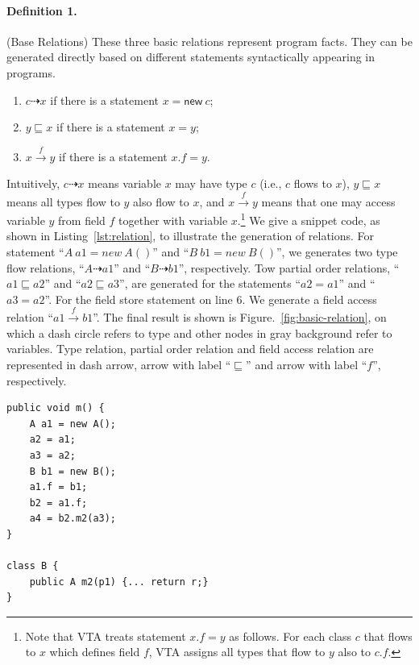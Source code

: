 \documentclass{fac}
\newcommand{\keyword}[1]{\mathsf{#1}}
\newcommand{\kwnew}[0]{\keyword{new}}
\newcommand{\less}{\sqsubseteq}
\newcommand{\tflow}{\dashrightarrow}
\newcommand{\hflow}{\longrightarrow}
\newcommand{\lhflow}[1]{\stackrel{#1}{\hflow}}
\begin{document}
\paragraph{Definition 1.}\label{def:base} (Base Relations)
These three basic relations represent program facts. They can be generated directly based on different statements syntactically appearing in programs.
\begin{enumerate}
  \item $c\tflow x$ if there is a statement $x = \kwnew\ c$;
  \item $y\less x$ if there is a statement $x = y $;
  \item $x\lhflow{f}y$ if there is a statement $x.f = y$.
\end{enumerate}
Intuitively, $c\tflow x$ means variable $x$ may have type $c$ (i.e., $c$ flows to $x$), $y\less x$ means all types flow to $y$ also flow to $x$, and $x\lhflow{f}y$ means that one may access variable $y$ from field $f$ together with variable $x$.\footnote{Note that VTA treats statement $x.f = y$ as follows. For each class $c$ that flows to $x$ which defines field $f$, VTA assigns all types that flow to $y$ also to $c.f$.}
We give a snippet code, as shown in Listing~\ref{lst:relation}, to illustrate the generation of relations. For statement ``$A\ a1=new \ A()$'' and ``$B\ b1=new\ B()$'', we generates two type flow relations, ``$A \tflow a1$'' and ``$B \tflow b1$'', respectively. Tow partial order relations, ``$a1 \less a2$'' and ``$a2 \less a3$'', are generated for the statements ``$a2=a1$'' and ``$a3=a2$''. For the field store statement on line 6. We generate a field access relation ``$a1 \lhflow{f} b1$''. The final result is shown is Figure.~\ref{fig:basic-relation}, on which a dash circle refers to type and other nodes in gray background refer to variables. Type relation, partial order relation and field access relation are represented in dash arrow, arrow with label ``$\less$'' and arrow with label ``$f$'', respectively.
\begin{minipage}{\linewidth}
\vspace{10pt}
\begin{lstlisting}[caption={Example for generation of relations},label={lst:relation}]
public void m() {
	A a1 = new A();
	a2 = a1;
	a3 = a2;
	B b1 = new B();
	a1.f = b1;
	b2 = a1.f;
	a4 = b2.m2(a3);
}

class B {
	public A m2(p1) {... return r;}
}
\end{lstlisting}
\end{minipage}
\end{document}
